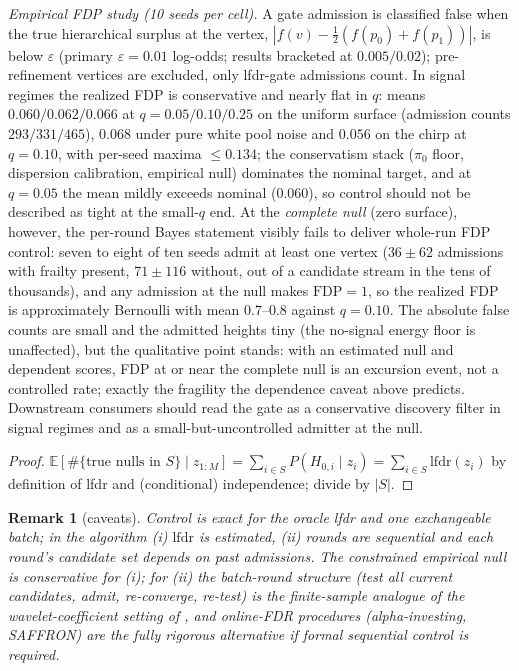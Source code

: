 \documentclass[11pt]{article}
\newtheorem{remark}[proposition]{Remark}
\newcommand{\E}{\mathbb{E}}
\newcommand{\lfdr}{\mathrm{lfdr}}
\begin{document}
\emph{Empirical FDP study (10 seeds per cell).} A gate admission is classified
false when the true hierarchical surplus at the vertex,
$|f(v)-\tfrac12(f(p_0)+f(p_1))|$, is below $\varepsilon$ (primary
$\varepsilon=0.01$ log-odds; results bracketed at $0.005/0.02$);
pre-refinement vertices are excluded, only lfdr-gate admissions count. In
signal regimes the realized FDP is conservative and nearly flat in $q$:
means $0.060/0.062/0.066$ at $q=0.05/0.10/0.25$ on the uniform surface
(admission counts $293/331/465$), $0.068$ under pure white pool noise and
$0.056$ on the chirp at $q=0.10$, with per-seed maxima $\le0.134$; the
conservatism stack ($\pi_0$ floor, dispersion calibration, empirical null)
dominates the nominal target, and at $q=0.05$ the mean mildly exceeds nominal
($0.060$), so control should not be described as tight at the small-$q$ end.
At the \emph{complete null} (zero surface), however, the per-round Bayes
statement visibly fails to deliver whole-run FDP control: seven to eight of
ten seeds admit at least one vertex ($36\pm62$ admissions with frailty
present, $71\pm116$ without, out of a candidate stream in the tens of
thousands), and any admission at the null makes $\mathrm{FDP}=1$, so the
realized FDP is approximately Bernoulli with mean $0.7$--$0.8$ against
$q=0.10$. The absolute false counts are small and the admitted heights tiny
(the no-signal energy floor is unaffected), but the qualitative point stands:
with an estimated null and dependent scores, FDP at or near the complete null
is an excursion event, not a controlled rate; exactly the fragility the
dependence caveat above predicts. Downstream consumers should read the gate
as a conservative discovery filter in signal regimes and as a
small-but-uncontrolled admitter at the null.
\begin{proof}
$\E[\#\{\text{true nulls in }S\}\mid z_{1:M}]=\sum_{i\in S}P(H_{0,i}\mid z_i)
=\sum_{i\in S}\lfdr(z_i)$ by definition of lfdr and (conditional) independence; divide
by $|S|$.
\end{proof}

\begin{remark}[caveats]
Control is exact for the oracle lfdr and one exchangeable batch; in the algorithm
(i) $\lfdr$ is estimated, (ii) rounds are sequential and each round's candidate set
depends on past admissions. The constrained empirical null is conservative for (i);
for (ii) the batch-round structure (test all current candidates, admit, re-converge,
re-test) is the finite-sample analogue of the wavelet-coefficient setting of
\cite{abramovich2006}, and online-FDR procedures (alpha-investing, SAFFRON) are the
fully rigorous alternative if formal sequential control is required.
\end{remark}
\end{document}
